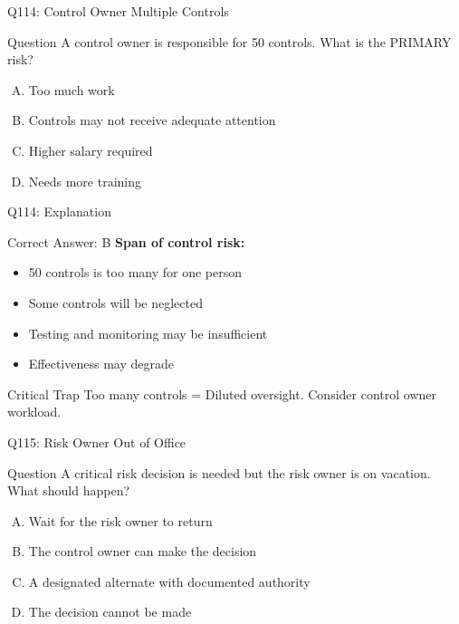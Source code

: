 \documentclass{beamer}
\begin{document}
	\begin{frame}{Q114: Control Owner Multiple Controls}
		\begin{block}{Question}
			A control owner is responsible for 50 controls. What is the PRIMARY risk?
		\end{block}
		\begin{enumerate}[(A)]
			\item Too much work
			\item Controls may not receive adequate attention
			\item Higher salary required
			\item Needs more training
		\end{enumerate}
	\end{frame}
	
	\begin{frame}{Q114: Explanation}
		\begin{block}{Correct Answer: B}
			\textbf{Span of control risk:}
			\begin{itemize}
				\item 50 controls is too many for one person
				\item Some controls will be neglected
				\item Testing and monitoring may be insufficient
				\item Effectiveness may degrade
			\end{itemize}
		\end{block}
		\begin{alertblock}{Critical Trap}
			Too many controls = Diluted oversight.
			Consider control owner workload.
		\end{alertblock}
	\end{frame}
	
	\begin{frame}{Q115: Risk Owner Out of Office}
		\begin{block}{Question}
			A critical risk decision is needed but the risk owner is on vacation. What should happen?
		\end{block}
		\begin{enumerate}[(A)]
			\item Wait for the risk owner to return
			\item The control owner can make the decision
			\item A designated alternate with documented authority
			\item The decision cannot be made
		\end{enumerate}
	\end{frame}
	
\end{document}
